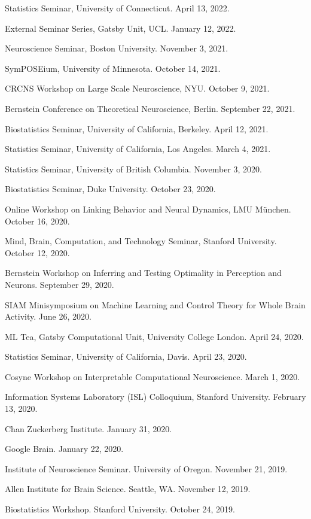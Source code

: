 \documentclass[10pt]{article}
\begin{document}
\begin{outerlist}
\item Statistics Seminar, University of Connecticut. April 13, 2022.
\item External Seminar Series, Gatsby Unit, UCL. January 12, 2022.
\item Neuroscience Seminar, Boston University. November 3, 2021.
\item SymPOSEium, University of Minnesota. October 14, 2021.
\item CRCNS Workshop on Large Scale Neuroscience, NYU. October 9, 2021.
\item Bernstein Conference on Theoretical Neuroscience, Berlin. September 22, 2021.
\item Biostatistics Seminar, University of California, Berkeley. April 12, 2021.
\item Statistics Seminar, University of California, Los Angeles. March 4, 2021.
\item Statistics Seminar, University of British Columbia. November 3, 2020.
\item Biostatistics Seminar, Duke University. October 23, 2020.
\item Online Workshop on Linking Behavior and Neural Dynamics, LMU M\"{u}nchen. October 16, 2020.
\item Mind, Brain, Computation, and Technology Seminar, Stanford University. October 12, 2020.
\item Bernstein Workshop on Inferring and Testing Optimality in Perception and Neurons. September 29, 2020.
\item SIAM Minisymposium on Machine Learning and Control Theory for Whole Brain Activity. June 26, 2020.
\item ML Tea, Gatsby Computational Unit, University College London. April 24, 2020.
\item Statistics Seminar, University of California, Davis. April 23, 2020.
\item Cosyne Workshop on Interpretable Computational Neuroscience. March 1, 2020.
\item Information Systems Laboratory (ISL) Colloquium, Stanford University. February 13, 2020.
\item Chan Zuckerberg Institute. January 31, 2020.
\item Google Brain. January 22, 2020. 
\item Institute of Neuroscience Seminar.  University of Oregon.  November 21, 2019.
\item Allen Institute for Brain Science. Seattle, WA. November 12, 2019.
\item Biostatistics Workshop.  Stanford University.  October 24, 2019.

\end{outerlist}
\end{document}
